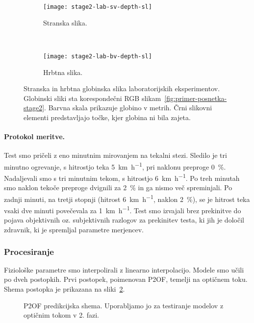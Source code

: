 \begin{figure}[!htb]
	\centering
	\begin{subfigure}[t]{0.45\columnwidth}
		\centering
		\texttt{[image: stage2-lab-sv-depth-sl]}
		\caption{Stranska slika.}
	\end{subfigure}
	~
	\begin{subfigure}[t]{0.45\columnwidth}
		\centering
		\texttt{[image: stage2-lab-bv-depth-sl]}
		\caption{Hrbtna slika.}
	\end{subfigure}
	\caption[Stranska in hrbtna globinska slika laboratorijskih eksperimentov]{Stranska in hrbtna globinska slika laboratorijskih eksperimentov. Globinski sliki sta korespondečni RGB slikam~\ref{fig:primer-posnetka-stage2}. Barvna skala prikazuje globino v metrih. Črni slikovni elementi predstavljajo točke, kjer globina ni bila zajeta.}
	\label{fig:stage2-lab-of-depth}
\end{figure}



\paragraph{Protokol meritve.}
Test smo pričeli z eno minutnim mirovanjem na tekalni stezi. Sledilo je tri minutno ogrevanje, s hitrostjo teka \SI{5}{\km\per\hour}, pri naklonu preproge \SI{0}{\%}. Nadaljevali smo s tri minutnim tekom, s hitrostjo \SI{6}{\km\per\hour}. Po treh minutah smo naklon tekoče preproge dvignili za \SI{2}{\%} in ga nismo več spreminjali. Po zadnji minuti, na tretji stopnji (hitrost \SI{6}{\km\per\hour}, naklon \SI{2}{\%}), se je hitrost teka vsaki dve minuti povečevala za \SI{1}{\km\per\hour}. Test smo izvajali brez prekinitve do pojava objektivnih oz. subjektivnih razlogov za prekinitev testa, ki jih je določil zdravnik, ki je spremljal parametre merjencev. 
 

\subsubsection{Procesiranje}
Fiziološke parametre smo interpolirali z linearno interpolacijo. Modele smo učili po dveh postopkih. Prvi postopek, poimenovan P2OF, temelji na optičnem toku. Shema postopka je prikazana na sliki~\ref{fig:diagram-procesiranja-of-stage2}.

\begin{figure}[!htb]
	\centering
	\resizebox{\columnwidth}{!}{}
	\caption[P2OF predikcijska shema]{P2OF predikcijska shema. Uporabljamo jo za testiranje modelov z optičnim tokom v 2. fazi.}
	\label{fig:diagram-procesiranja-of-stage2}
\end{figure}


